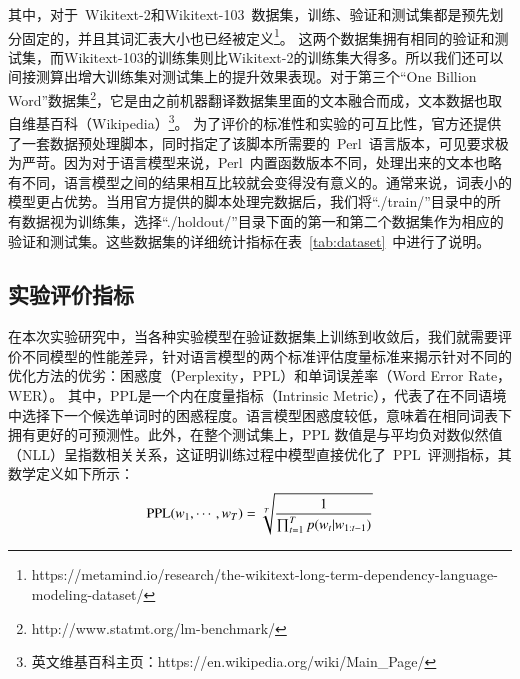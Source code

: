 其中，对于~Wikitext-2和Wikitext-103~数据集，训练、验证和测试集都是预先划分固定的，并且其词汇表大小也已经被定义\footnote{https://metamind.io/research/the-wikitext-long-term-dependency-language-modeling-dataset/}。
这两个数据集拥有相同的验证和测试集，而Wikitext-103的训练集则比Wikitext-2的训练集大得多。所以我们还可以间接测算出增大训练集对测试集上的提升效果表现。对于第三个``One Billion Word''数据集\footnote{http://www.statmt.org/lm-benchmark/}，它是由之前机器翻译数据集里面的文本融合而成，文本数据也取自维基百科（Wikipedia）\footnote{英文维基百科主页：https://en.wikipedia.org/wiki/Main\_Page/}。
为了评价的标准性和实验的可互比性，官方还提供了一套数据预处理脚本，同时指定了该脚本所需要的~Perl~语言版本，可见要求极为严苛。因为对于语言模型来说，Perl~内置函数版本不同，处理出来的文本也略有不同，语言模型之间的结果相互比较就会变得没有意义的。通常来说，词表小的模型更占优势。当用官方提供的脚本处理完数据后，我们将``./train/''目录中的所有数据视为训练集，选择``./holdout/''目录下面的第一和第二个数据集作为相应的验证和测试集。这些数据集的详细统计指标在表~\ref{tab:dataset}~中进行了说明。

\subsection{实验评价指标}
在本次实验研究中，当各种实验模型在验证数据集上训练到收敛后，我们就需要评价不同模型的性能差异，针对语言模型的两个标准评估度量标准来揭示针对不同的优化方法的优劣：困惑度（Perplexity，$ \mathrm{PPL} $）和单词误差率（Word Error Rate，$\mathrm{WER} $）。
其中，$ \mathrm{PPL} $是一个内在度量指标（Intrinsic Metric），代表了在不同语境中选择下一个候选单词时的困惑程度。语言模型困惑度较低，意味着在相同词表下拥有更好的可预测性。此外，在整个测试集上，$\mathrm{PPL}$ 数值是与平均负对数似然值（NLL）呈指数相关关系，这证明训练过程中模型直接优化了~$ \mathrm{PPL} $~评测指标，其数学定义如下所示：
\begin{equation}\label{equ:ppl}
\setlength{\abovedisplayskip}{6pt}
\setlength{\belowdisplayskip}{6pt}
   \mathrm{PPL}(w_1,\cdots,w_T)=\sqrt[T]{\frac{1}{\prod_{t=1}^T p(w_t|w_{1:t-1})}}
\end{equation}

